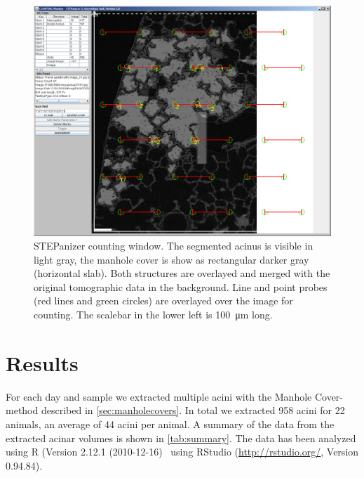 \documentclass[%
	paper=a4,%
	abstract=true,%
	]{scrartcl}
\newcommand{\imsize}{\linewidth}
\begin{document}
\renewcommand{\imsize}{\linewidth}
\begin{figure}
	\centering
	\includegraphics[width=\imsize]{img/CountingWindowSTEPanizer}
	\caption{STEPanizer counting window. The segmented acinus is visible in light gray, the manhole cover is show as rectangular darker gray (horizontal slab). Both structures are overlayed and merged with the original tomographic data in the background. Line and point probes (red lines and green circles) are overlayed over the image for counting. The scalebar in the lower left is \SI{100}{\micro\meter} long.}
	\label{fig:STEPanizer}
\end{figure}

\section{Results\label{sec:Results}}
For each day and sample we extracted multiple acini with the Manhole Cover-method described in \autoref{sec:manholecovers}. In total we extracted 958 acini for 22 animals, an average of 44 acini per animal. A summary of the data from the extracted acinar volumes is shown in \autoref{tab:summary}. The data has been analyzed using R (Version 2.12.1 (2010-12-16)~\cite{R} using RStudio (\url{http://rstudio.org/}, Version 0.94.84).
\end{document}
